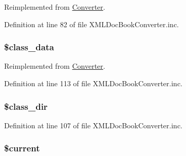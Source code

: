 \-Reimplemented from \hyperlink{class_converter_a252ba022809910ea710a068fc1bab657}{\-Converter}.



\-Definition at line 82 of file \-X\-M\-L\-Doc\-Book\-Converter.\-inc.

\hypertarget{class_x_m_l_doc_book_converter_afdb3770ba45b6d4db2c00c8c18832482}{
\subsubsection[{\$class\-\_\-data}]{\setlength{\rightskip}{0pt plus 5cm}\$class\-\_\-data}}\label{class_x_m_l_doc_book_converter_afdb3770ba45b6d4db2c00c8c18832482}


\-Reimplemented from \hyperlink{class_converter_afdb3770ba45b6d4db2c00c8c18832482}{\-Converter}.



\-Definition at line 113 of file \-X\-M\-L\-Doc\-Book\-Converter.\-inc.

\hypertarget{class_x_m_l_doc_book_converter_aaeaa82d379050faafbb4bf4b82733c94}{
\subsubsection[{\$class\-\_\-dir}]{\setlength{\rightskip}{0pt plus 5cm}\$class\-\_\-dir}}\label{class_x_m_l_doc_book_converter_aaeaa82d379050faafbb4bf4b82733c94}


\-Definition at line 107 of file \-X\-M\-L\-Doc\-Book\-Converter.\-inc.

\hypertarget{class_x_m_l_doc_book_converter_a2c4c58e377f6c66ca38c8ea97666fc5e}{
\subsubsection[{\$current}]{\setlength{\rightskip}{0pt plus 5cm}\$current}}\label{class_x_m_l_doc_book_converter_a2c4c58e377f6c66ca38c8ea97666fc5e}


